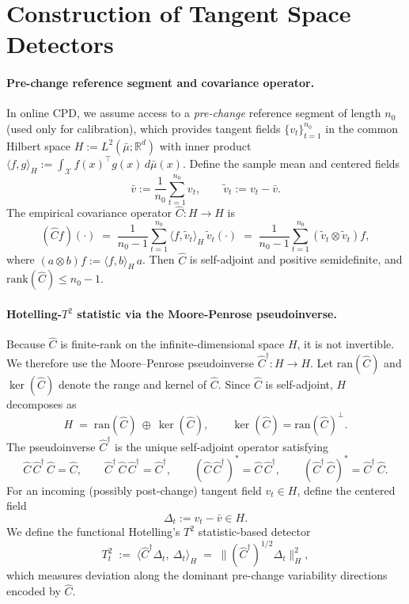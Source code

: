 \documentclass{article}
\theoremstyle{plain}
\theoremstyle{definition}
\theoremstyle{remark}
\begin{document}
\section{Construction of Tangent Space Detectors}
\label{app:pseudo}

\paragraph{Pre-change reference segment and covariance operator.}
In online CPD, we assume access to a \emph{pre-change} reference segment of length $n_0$ (used only for
calibration), which provides tangent fields $\{v_t\}_{t=1}^{n_0}$ in the common Hilbert space
$H:=L^2(\bar\mu;\mathbb R^d)$ with inner product
$\langle f,g\rangle_H := \int_{\mathcal X} f(x)^\top g(x)\,d\bar\mu(x)$.
Define the sample mean and centered fields
\[
\bar v := \frac{1}{n_0}\sum_{t=1}^{n_0} v_t, 
\qquad 
\tilde v_t := v_t-\bar v.
\]
The empirical covariance operator $\widehat C:H\to H$ is
\begin{equation}
\label{eq:cov-op-app}
(\widehat C f)(\cdot)
\;=\;
\frac{1}{n_0-1}\sum_{t=1}^{n_0}\langle f,\tilde v_t\rangle_H\,\tilde v_t(\cdot)
\;=\;
\frac{1}{n_0-1}\sum_{t=1}^{n_0}(\tilde v_t\otimes \tilde v_t)f,
\end{equation}
where $(a\otimes b)f := \langle f,b\rangle_H\,a$.
Then $\widehat C$ is self-adjoint and positive semidefinite, and
$\mathrm{rank}(\widehat C)\le n_0-1$.

\paragraph{Hotelling-$T^2$ statistic via the Moore-Penrose pseudoinverse.}
Because $\widehat C$ is finite-rank on the infinite-dimensional space $H$, it is not invertible.
We therefore use the Moore--Penrose pseudoinverse $\widehat C^{\dagger}:H\to H$.
Let $\mathrm{ran}(\widehat C)$ and $\ker(\widehat C)$ denote the range and kernel of $\widehat C$.
Since $\widehat C$ is self-adjoint, $H$ decomposes as
\[
H \;=\; \mathrm{ran}(\widehat C)\ \oplus\ \ker(\widehat C),
\qquad \ker(\widehat C)=\mathrm{ran}(\widehat C)^\perp.
\]
The pseudoinverse $\widehat C^{\dagger}$ is the unique self-adjoint operator satisfying
\[
\widehat C\,\widehat C^{\dagger}\,\widehat C=\widehat C,
\qquad
\widehat C^{\dagger}\,\widehat C\,\widehat C^{\dagger}=\widehat C^{\dagger},
\qquad
(\widehat C\,\widehat C^{\dagger})^*=\widehat C\,\widehat C^{\dagger},
\qquad
(\widehat C^{\dagger}\,\widehat C)^*=\widehat C^{\dagger}\,\widehat C.
\]
For an incoming (possibly post-change) tangent field $v_t\in H$, define the centered field
\[
\Delta_t := v_t-\bar v\in H.
\]
We define the functional Hotelling's $T^2$ statistic-based detector
\begin{equation}
\label{eq:T2-pinv-app}
T_t^2
\;:=\;
\big\langle \widehat C^{\dagger}\Delta_t,\ \Delta_t \big\rangle_H
\;=\;
\big\|(\widehat C^{\dagger})^{1/2}\Delta_t\big\|_H^2,
\end{equation}
which measures deviation along the dominant pre-change variability directions encoded by $\widehat C$.
\end{document}

